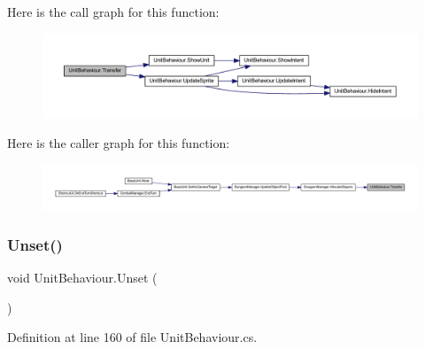 Here is the call graph for this function\+:
\nopagebreak
\begin{figure}[H]
\begin{center}
\leavevmode
\includegraphics[width=350pt]{class_unit_behaviour_a7e978454f207985987f6088c037b9c5f_cgraph}
\end{center}
\end{figure}
Here is the caller graph for this function\+:
\nopagebreak
\begin{figure}[H]
\begin{center}
\leavevmode
\includegraphics[width=350pt]{class_unit_behaviour_a7e978454f207985987f6088c037b9c5f_icgraph}
\end{center}
\end{figure}
\mbox{\label{class_unit_behaviour_adf2d07785a2cc3076363ad5dd0962b9c}} 
\subsubsection{\texorpdfstring{Unset()}{Unset()}}
{\footnotesize\ttfamily void Unit\+Behaviour.\+Unset (\begin{DoxyParamCaption}{ }\end{DoxyParamCaption})}



Definition at line 160 of file Unit\+Behaviour.\+cs.

